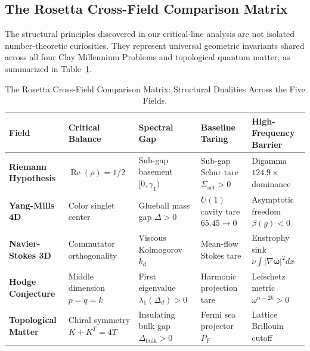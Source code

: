 \documentclass[11pt,a4paper]{article}
\begin{document}
\subsection{The Rosetta Cross-Field Comparison Matrix}
The structural principles discovered in our critical-line analysis are not isolated number-theoretic curiosities. They represent universal geometric invariants shared across all four Clay Millennium Problems and topological quantum matter, as summarized in Table~\ref{tab:rosetta_matrix}.

\begin{table}[htbp]
\centering
\small
\caption{The Rosetta Cross-Field Comparison Matrix: Structural Dualities Across the Five Fields.}
\label{tab:rosetta_matrix}
\begin{tabular}{@{}lllll@{}}
\toprule
Field & Critical Balance & Spectral Gap & Baseline Taring & High-Frequency Barrier \\
\midrule
\textbf{Riemann Hypothesis} & $\operatorname{Re}(\rho) = 1/2$ & Sub-gap basement $[0, \gamma_1)$ & Sub-gap Schur tare $\Sigma_{\mathrm{act}} > 0$ & Digamma $124.9\times$ dominance \\
\textbf{Yang-Mills 4D} & Color singlet center & Glueball mass gap $\Delta > 0$ & $U(1)$ cavity tare $65.45 \to 0$ & Asymptotic freedom $\beta(g) < 0$ \\
\textbf{Navier-Stokes 3D} & Commutator orthogonality & Viscous Kolmogorov $k_d$ & Mean-flow Stokes tare & Enstrophy sink $\nu \int |\nabla\boldsymbol{\omega}|^2 dx$ \\
\textbf{Hodge Conjecture} & Middle dimension $p=q=k$ & First eigenvalue $\lambda_1(\Delta_d) > 0$ & Harmonic projection tare & Lefschetz metric $\omega^{n-2k} > 0$ \\
\textbf{Topological Matter} & Chiral symmetry $K + K^T = 4T$ & Insulating bulk gap $\Delta_{\mathrm{bulk}} > 0$ & Fermi sea projector $P_F$ & Lattice Brillouin cutoff \\
\bottomrule
\end{tabular}
\end{table}
\end{document}

